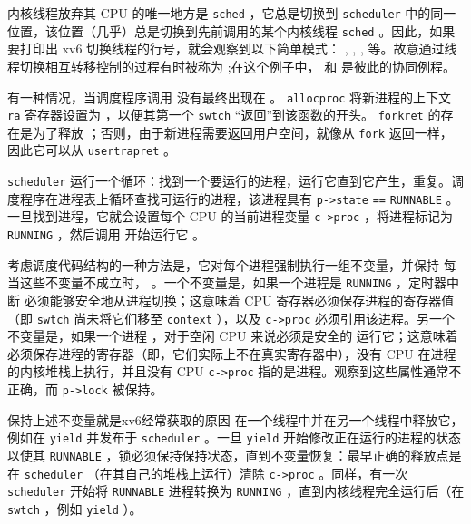 \documentclass[UTF8]{article}
\begin{document}
内核线程放弃其 CPU 的唯一地方是
    \lstinline{sched}    ，它总是切换到    \lstinline{scheduler}    中的同一位置，该位置（几乎）总是切换到先前调用的某个内核线程
    \lstinline{sched}    。因此，如果要打印出 xv6 切换线程的行号，就会观察到以下简单模式：
        ,
        ,
        ,
        等。故意通过线程切换相互转移控制的过程有时被称为
       ;在这个例子中，
        和
        是彼此的协同例程。  

有一种情况，当调度程序调用
        没有最终出现在
        。
    \lstinline{allocproc}    将新进程的上下文    \lstinline{ra}    寄存器设置为
        ，以便其第一个    \lstinline{swtch}    “返回”到该函数的开头。
    \lstinline{forkret}    的存在是为了释放
        ；否则，由于新进程需要返回用户空间，就像从    \lstinline{fork}    返回一样，因此它可以从
    \lstinline{usertrapret}    。  

   \lstinline{scheduler}   
        运行一个循环：找到一个要运行的进程，运行它直到它产生，重复。调度程序在进程表上循环查找可运行的进程，该进程具有
    \lstinline{p->state}   
    \lstinline{==}   
    \lstinline{RUNNABLE}    。一旦找到进程，它就会设置每个 CPU 的当前进程变量
    \lstinline{c->proc}    ，将进程标记为
    \lstinline{RUNNING}    ，然后调用
        开始运行它
        。  

考虑调度代码结构的一种方法是，它对每个进程强制执行一组不变量，并保持
 每当这些不变量不成立时，      。一个不变量是，如果一个进程是
    \lstinline{RUNNING}    ，定时器中断
        必须能够安全地从进程切换；这意味着 CPU 寄存器必须保存进程的寄存器值（即
    \lstinline{swtch}    尚未将它们移至
    \lstinline{context}    ），以及
    \lstinline{c->proc}    必须引用该进程。另一个不变量是，如果一个进程
        ，对于空闲 CPU 来说必须是安全的
        运行它；这意味着
        必须保存进程的寄存器（即，它们实际上不在真实寄存器中），没有 CPU 在进程的内核堆栈上执行，并且没有 CPU
    \lstinline{c->proc}    指的是进程。观察到这些属性通常不正确，而
    \lstinline{p->lock}    被保持。  

保持上述不变量就是xv6经常获取的原因
        在一个线程中并在另一个线程中释放它，例如在
    \lstinline{yield}    并发布于
    \lstinline{scheduler}    。一旦    \lstinline{yield}    开始修改正在运行的进程的状态以使其
    \lstinline{RUNNABLE}    ，锁必须保持保持状态，直到不变量恢复：最早正确的释放点是在
    \lstinline{scheduler}   （在其自己的堆栈上运行）清除
    \lstinline{c->proc}    。同样，有一次
    \lstinline{scheduler}    开始将    \lstinline{RUNNABLE}    进程转换为
    \lstinline{RUNNING}    ，直到内核线程完全运行后（在
    \lstinline{swtch}    ，例如
    \lstinline{yield}    ）。
\end{document}
